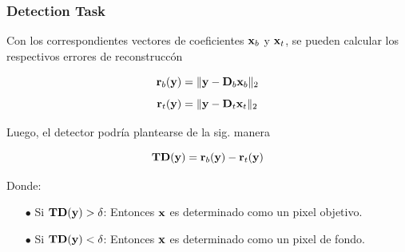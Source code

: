 \documentclass[spanish,xcolor=dvipsnames]{beamer}
\begin{document}
\begin{frame}
	\frametitle{Detection Task}

Con los correspondientes vectores de coeficientes ${\bf x}_b$ y ${\bf x}_t$, se pueden calcular los respectivos errores de reconstruccón

	\begin {equation}
		\nonumber {\bf r}_b ( {\bf y} )=\| {\bf y} - {\bf D}_b  {\bf x}_b \|_2
	\end{equation}
	\begin {equation}
		\nonumber {\bf r}_t ( {\bf y} )=\| {\bf y} - {\bf D}_t  {\bf x}_t \|_2
	\end{equation}

Luego, el detector podría plantearse de la sig. manera

	\begin {equation}
		\nonumber {\bf TD} ( {\bf y} )={\bf r}_b ( {\bf y} ) - {\bf r}_t ( {\bf y} )
	\end{equation}

Donde:
	\begin{itemize}	
		\item[\color {black}\bf $\bullet$] Si ${\bf TD} ( {\bf y} ) > \delta$: Entonces ${\bf x}$ es determinado como un pixel objetivo.\\
		\item[\color {black}\bf $\bullet$] Si ${\bf TD} ( {\bf y} ) < \delta$: Entonces ${\bf x}$ es determinado como un pixel de fondo.\\
	\end{itemize}	
	
\end{frame}

\end{document}

